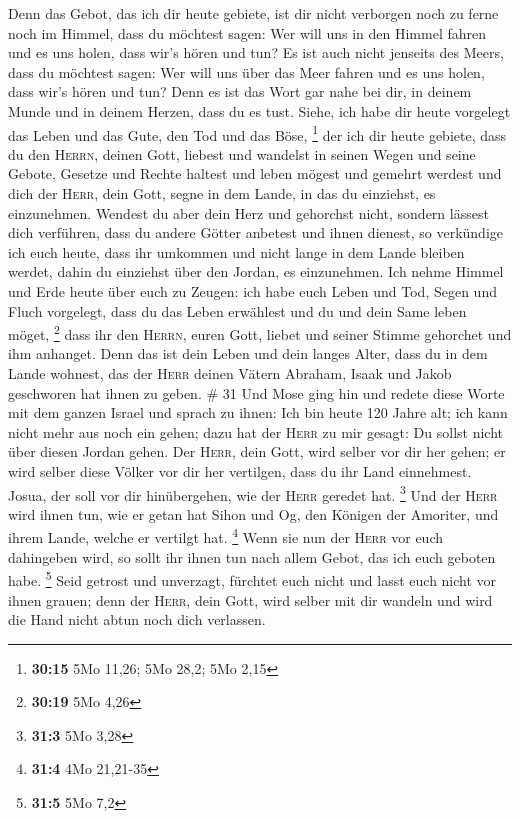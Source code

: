  Denn das Gebot, das ich dir heute gebiete, ist dir nicht
verborgen noch zu ferne  noch im Himmel, dass du möchtest
sagen: Wer will uns in den Himmel fahren und es uns holen, dass wir's
hören und tun?  Es ist auch nicht jenseits des Meers,
dass du möchtest sagen: Wer will uns über das Meer fahren und es uns
holen, dass wir's hören und tun?  Denn es ist das Wort
gar nahe bei dir, in deinem Munde und in deinem Herzen, dass du es tust.
 Siehe, ich habe dir heute vorgelegt das Leben und das
Gute, den Tod und das Böse, \footnote{\textbf{30:15} 5Mo 11,26; 5Mo
  28,2; 5Mo 2,15}  der ich dir heute gebiete, dass du den
\textsc{Herrn}, deinen Gott, liebest und wandelst in seinen Wegen und
seine Gebote, Gesetze und Rechte haltest und leben mögest und gemehrt
werdest und dich der \textsc{Herr}, dein Gott, segne in dem Lande, in
das du einziehst, es einzunehmen.  Wendest du aber dein
Herz und gehorchst nicht, sondern lässest dich verführen, dass du andere
Götter anbetest und ihnen dienest,  so verkündige ich
euch heute, dass ihr umkommen und nicht lange in dem Lande bleiben
werdet, dahin du einziehst über den Jordan, es einzunehmen.
 Ich nehme Himmel und Erde heute über euch zu Zeugen: ich
habe euch Leben und Tod, Segen und Fluch vorgelegt, dass du das Leben
erwählest und du und dein Same leben möget, \footnote{\textbf{30:19} 5Mo
  4,26}  dass ihr den \textsc{Herrn}, euren Gott, liebet
und seiner Stimme gehorchet und ihm anhanget. Denn das ist dein Leben
und dein langes Alter, dass du in dem Lande wohnest, das der
\textsc{Herr} deinen Vätern Abraham, Isaak und Jakob geschworen hat
ihnen zu geben. \# 31  Und Mose ging hin und redete diese
Worte mit dem ganzen Israel  und sprach zu ihnen: Ich bin
heute 120 Jahre alt; ich kann nicht mehr aus noch ein gehen; dazu hat
der \textsc{Herr} zu mir gesagt: Du sollst nicht über diesen Jordan
gehen.  Der \textsc{Herr}, dein Gott, wird selber vor dir
her gehen; er wird selber diese Völker vor dir her vertilgen, dass du
ihr Land einnehmest. Josua, der soll vor dir hinübergehen, wie der
\textsc{Herr} geredet hat. \footnote{\textbf{31:3} 5Mo 3,28}
 Und der \textsc{Herr} wird ihnen tun, wie er getan hat
Sihon und Og, den Königen der Amoriter, und ihrem Lande, welche er
vertilgt hat. \footnote{\textbf{31:4} 4Mo 21,21-35}  Wenn
sie nun der \textsc{Herr} vor euch dahingeben wird, so sollt ihr ihnen
tun nach allem Gebot, das ich euch geboten habe. \footnote{\textbf{31:5}
  5Mo 7,2}  Seid getrost und unverzagt, fürchtet euch
nicht und lasst euch nicht vor ihnen grauen; denn der \textsc{Herr},
dein Gott, wird selber mit dir wandeln und wird die Hand nicht abtun
noch dich verlassen.

